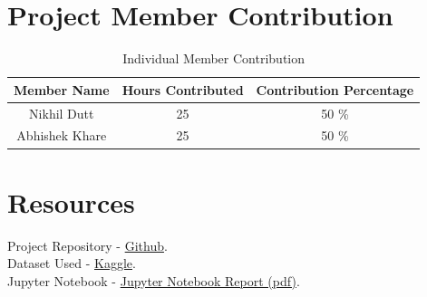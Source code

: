 \documentclass[conference]{IEEEtran}
\begin{document}
\section{\textbf{Project Member Contribution}}
\begin{table}[htbp]
\begin{tabular}{|c|c|c|}
\hline
Member Name    & Hours Contributed & Contribution Percentage \\ \hline
Nikhil Dutt    & 25                & 50 \%                   \\ \hline
Abhishek Khare & 25                & 50 \%                   \\ \hline
\end{tabular}
\caption{Individual Member Contribution}
\end{table}

\section{\textbf{Resources}}
\noindent Project Repository - \href{https://github.com/abhishekkhare1998/Hotel-Booking-Recommendation}{Github}.\\
 Dataset Used - \href{https://www.kaggle.com/competitions/expedia-hotel-recommendations/data}{Kaggle}. \\
 Jupyter Notebook - \href{https://drive.google.com/file/d/17VUEoMIntPbKG1G3mKDFtrBeXv-4nBur/view?usp=sharing}{Jupyter Notebook Report (pdf)}.


\end{document}
